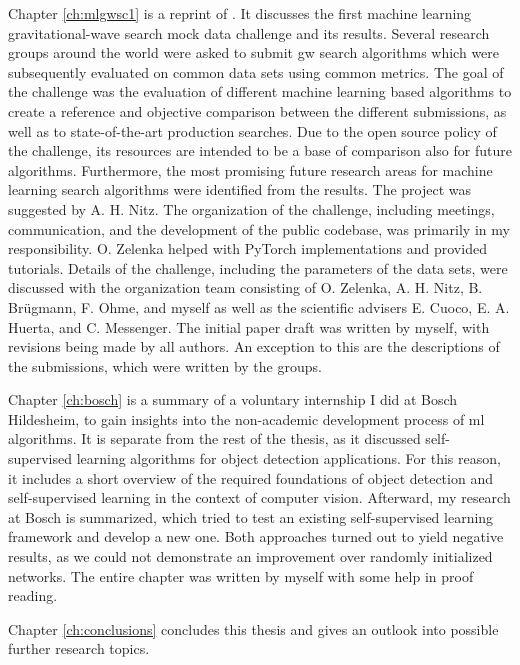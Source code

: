 Chapter \ref{ch:mlgwsc1} is a reprint of \cite{Schafer:2022dxv}. It discusses the first machine learning gravitational-wave search mock data challenge and its results. Several research groups around the world were asked to submit \acrshort{gw} search algorithms which were subsequently evaluated on common data sets using common metrics. The goal of the challenge was the evaluation of different machine learning based algorithms to create a reference and objective comparison between the different submissions, as well as to state-of-the-art production searches. Due to the open source policy of the challenge, its resources are intended to be a base of comparison also for future algorithms. Furthermore, the most promising future research areas for machine learning search algorithms were identified from the results. The project was suggested by A. H. Nitz. The organization of the challenge, including meetings, communication, and the development of the public codebase, was primarily in my responsibility. O. Zelenka helped with PyTorch implementations and provided tutorials. Details of the challenge, including the parameters of the data sets, were discussed with the organization team consisting of O. Zelenka, A. H. Nitz, B. Brügmann, F. Ohme, and myself as well as the scientific advisers E. Cuoco, E. A. Huerta, and C. Messenger. The initial paper draft was written by myself, with revisions being made by all authors. An exception to this are the descriptions of the submissions, which were written by the groups.

Chapter \ref{ch:bosch} is a summary of a voluntary internship I did at Bosch Hildesheim, to gain insights into the non-academic development process of \acrshort{ml} algorithms. It is separate from the rest of the thesis, as it discussed self-supervised learning algorithms for object detection applications. For this reason, it includes a short overview of the required foundations of object detection and self-supervised learning in the context of computer vision. Afterward, my research at Bosch is summarized, which tried to test an existing  self-supervised learning framework and develop a new one. Both approaches turned out to yield negative results, as we could not demonstrate an improvement over randomly initialized networks. The entire chapter was written by myself with some help in proof reading.

Chapter \ref{ch:conclusions} concludes this thesis and gives an outlook into possible further research topics.
